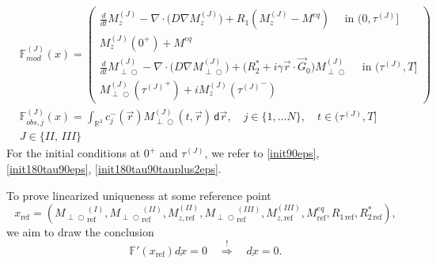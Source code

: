 \documentclass{ws-m3as}
\newcommand{\uld}[1]{\underline{d#1}}
\def\Mpp{M_{\perp\!\!\!\!\!\bigcirc}}
\newcommand\taup{\varepsilon}
\begin{document}
\[
\begin{aligned}
&\mathbb{F}^{(J)}_{mod}(x)
=\left(\begin{array}{l}
\frac{d}{dt}M_z^{(J)}-\nabla\cdot\bigl(D\nabla M_z^{(J)}\bigr)+R_1 (M_z^{(J)}-M^{eq})
\quad\text{ in }(0,\tau^{(J)}]\\
M_z^{(J)}(0^+)+M^{eq}\\
\frac{d}{dt}\Mpp^{(J)}-\nabla\cdot\bigl(D \nabla \Mpp^{(J)}\bigr) +\bigl(R_2^*+i\gamma\vec r \cdot \vec G_0\bigr)\Mpp^{(J)}
\quad\text{ in }(\tau^{(J)},T]\\
\Mpp^{(J)}({\tau^{(J)}}^+)+iM_z^{(J)}({\tau^{(J)}}^-)
\end{array}\right)
\\
&\mathbb{F}^{(J)}_{obs,j}(x)
=\int_{\mathbb{R}^3} c^-_j(\vec r) \Mpp^{(J)}(t, \vec r) \,\textsf{d}\vec r, \quad j\in\{1,\ldots N\}, \quad t\in(\tau^{(J)},T]\\
&J\in \{II,\, III\}
\end{aligned}
\]
For the initial conditions at 
$0^+$ and $\tau^{(J)}$, 
we refer to \eqref{init90eps}, \eqref{init180tau90eps}, \eqref{init180tau90tauplus2eps}.

To prove linearized uniqueness at some reference point 
\[
x_{\text{ref}}=({\Mpp}_{\text{ref}}^{(I)},{\Mpp}_{\text{ref}}^{(II)},M_{z,\text{ref}}^{(II)},{\Mpp}_{\text{ref}}^{(III)},M_{z,\text{ref}}^{(III)},M^{eq}_{\text{ref}},R_{1\,\text{ref}},R_{2\,\text{ref}}^*),
\] 
we aim to draw the conclusion
\begin{equation}\label{Fprimex0impliesdx0}
\mathbb{F}'(x_{\text{ref}})\uld{x}=0
\quad \stackrel{!}{\Rightarrow}\quad 
\uld{x}=0.
\end{equation}
\end{document}
